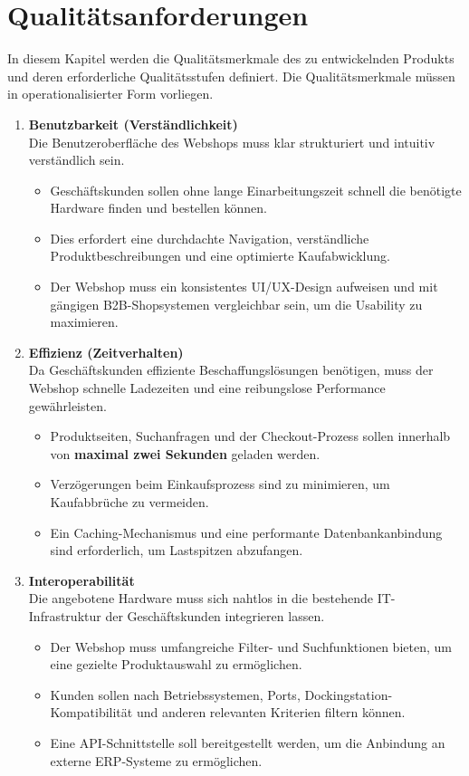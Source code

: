 \documentclass[%
	12pt,
	a4paper,
	oneside,
	parskip=full
]{scrbook}
\begin{document}
\chapter{Qualitätsanforderungen}
In diesem Kapitel werden die Qualitätsmerkmale des zu entwickelnden Produkts und deren erforderliche Qualitätsstufen definiert. Die Qualitätsmerkmale müssen in operationalisierter Form vorliegen.

\begin{enumerate}
	\item \textbf{Benutzbarkeit (Verständlichkeit)} \\
	Die Benutzeroberfläche des Webshops muss klar strukturiert und intuitiv verständlich sein. 
	\begin{itemize}
		\item Geschäftskunden sollen ohne lange Einarbeitungszeit schnell die benötigte Hardware finden und bestellen können. 
		\item Dies erfordert eine durchdachte Navigation, verständliche Produktbeschreibungen und eine optimierte Kaufabwicklung.
		\item Der Webshop muss ein konsistentes UI/UX-Design aufweisen und mit gängigen B2B-Shopsystemen vergleichbar sein, um die Usability zu maximieren.
	\end{itemize}
	
	\item \textbf{Effizienz (Zeitverhalten)} \\
	Da Geschäftskunden effiziente Beschaffungslösungen benötigen, muss der Webshop schnelle Ladezeiten und eine reibungslose Performance gewährleisten.
	\begin{itemize}
		\item Produktseiten, Suchanfragen und der Checkout-Prozess sollen innerhalb von \textbf{maximal zwei Sekunden} geladen werden.
		\item Verzögerungen beim Einkaufsprozess sind zu minimieren, um Kaufabbrüche zu vermeiden.
		\item Ein Caching-Mechanismus und eine performante Datenbankanbindung sind erforderlich, um Lastspitzen abzufangen.
	\end{itemize}
	
	\item \textbf{Interoperabilität} \\
	Die angebotene Hardware muss sich nahtlos in die bestehende IT-Infrastruktur der Geschäftskunden integrieren lassen.
	\begin{itemize}
		\item Der Webshop muss umfangreiche Filter- und Suchfunktionen bieten, um eine gezielte Produktauswahl zu ermöglichen.
		\item Kunden sollen nach Betriebssystemen, Ports, Dockingstation-Kompatibilität und anderen relevanten Kriterien filtern können.
		\item Eine API-Schnittstelle soll bereitgestellt werden, um die Anbindung an externe ERP-Systeme zu ermöglichen.
	\end{itemize}
	

\end{enumerate}
\end{document}

